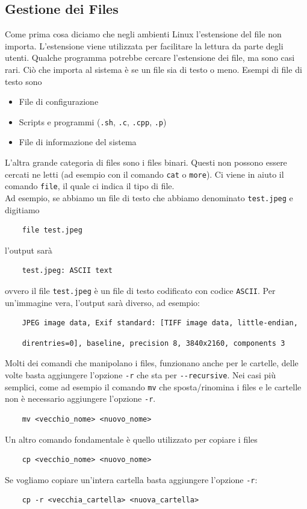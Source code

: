 \subsection{Gestione dei Files}
Come prima cosa diciamo che negli ambienti Linux l'estensione del file non importa. L'estensione viene utilizzata per facilitare la lettura da parte degli utenti. Qualche programma potrebbe cercare l'estensione dei file, ma sono casi rari. Ciò che importa al sistema è se un file sia di testo o meno. Esempi di file di testo sono
\begin{itemize}
	\item File di configurazione
	\item Scripts e programmi (\verb".sh", \verb".c", \verb".cpp", \verb".p")
	\item File di informazione del sistema
\end{itemize}
L'altra grande categoria di files sono i files binari. Questi non possono essere cercati ne letti (ad esempio con il comando \verb"cat" o \verb"more"). Ci viene in aiuto il comando \verb"file", il quale ci indica il tipo di file. \\
Ad esempio, se abbiamo un file di testo che abbiamo denominato \verb"test.jpeg" e digitiamo
\begin{verbatim}
	file test.jpeg
\end{verbatim}
l'output sarà
\begin{verbatim}
	test.jpeg: ASCII text
\end{verbatim}
ovvero il file \verb"test.jpeg" è un file di testo codificato con codice \verb"ASCII". Per un'immagine vera, l'output sarà diverso, ad esempio:
\begin{verbatim}
	JPEG image data, Exif standard: [TIFF image data, little-endian, 
\end{verbatim}
\begin{verbatim}
	direntries=0], baseline, precision 8, 3840x2160, components 3
\end{verbatim}

Molti dei comandi che manipolano i files, funzionano anche per le cartelle, delle volte basta aggiungere l'opzione \verb"-r" che sta per \verb"--recursive". Nei casi più semplici, come ad esempio il comando \verb"mv" che sposta/rinomina i files e le cartelle non è necessario aggiungere l'opzione \verb"-r". 
\begin{verbatim}
	mv <vecchio_nome> <nuovo_nome>
\end{verbatim}

Un altro comando fondamentale è quello utilizzato per copiare i files
\begin{verbatim}
	cp <vecchio_nome> <nuovo_nome>
\end{verbatim}
Se vogliamo copiare un'intera cartella basta aggiungere l'opzione \verb"-r":
\begin{verbatim}
	cp -r <vecchia_cartella> <nuova_cartella>
\end{verbatim}

